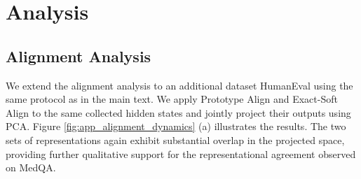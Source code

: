 \documentclass[11pt]{article}
\begin{document}

\section{Analysis}
\subsection{Alignment Analysis}
\label{app:alignment}
We extend the alignment analysis to an additional dataset HumanEval using the same protocol as in the main text. We apply Prototype Align and Exact-Soft Align to the same collected hidden states and jointly project their outputs using PCA. Figure \ref{fig:app_alignment_dynamics} (a) illustrates the results. The two sets of representations again exhibit substantial overlap in the projected space, providing further qualitative support for the representational agreement observed on MedQA.
\end{document}
